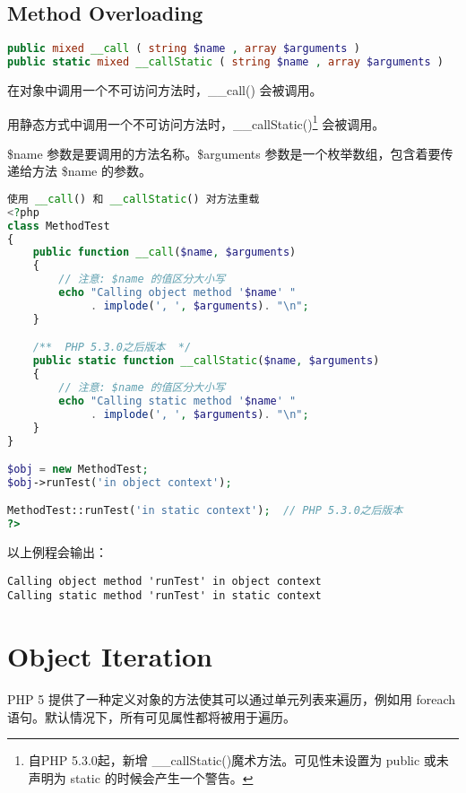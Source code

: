 \section{Method Overloading}


\begin{lstlisting}[language=PHP]
public mixed __call ( string $name , array $arguments )
public static mixed __callStatic ( string $name , array $arguments )
\end{lstlisting}

在对象中调用一个不可访问方法时，\_\_call() 会被调用。

用静态方式中调用一个不可访问方法时，\_\_callStatic()\footnote{自PHP 5.3.0起，新增 \_\_callStatic()魔术方法。可见性未设置为 public 或未声明为 static 的时候会产生一个警告。} 会被调用。

\$name 参数是要调用的方法名称。\$arguments 参数是一个枚举数组，包含着要传递给方法 \$name 的参数。

\begin{lstlisting}[language=PHP]
使用 __call() 和 __callStatic() 对方法重载
<?php
class MethodTest 
{
    public function __call($name, $arguments) 
    {
        // 注意: $name 的值区分大小写
        echo "Calling object method '$name' "
             . implode(', ', $arguments). "\n";
    }

    /**  PHP 5.3.0之后版本  */
    public static function __callStatic($name, $arguments) 
    {
        // 注意: $name 的值区分大小写
        echo "Calling static method '$name' "
             . implode(', ', $arguments). "\n";
    }
}

$obj = new MethodTest;
$obj->runTest('in object context');

MethodTest::runTest('in static context');  // PHP 5.3.0之后版本
?>
\end{lstlisting}

以上例程会输出：

\begin{verbatim}
Calling object method 'runTest' in object context
Calling static method 'runTest' in static context
\end{verbatim}


\chapter{Object Iteration}

PHP 5 提供了一种定义对象的方法使其可以通过单元列表来遍历，例如用 foreach 语句。默认情况下，所有可见属性都将被用于遍历。


